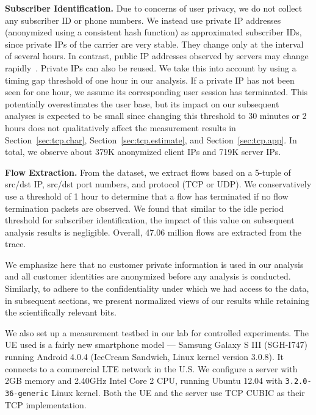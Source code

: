 \textbf{Subscriber Identification.} Due to concerns of user privacy, we do not collect any subscriber ID or phone numbers. We instead use private IP addresses (anonymized using a consistent hash function) as approximated subscriber IDs, since private IPs of the carrier are very stable. They change only at the interval of several hours. In contrast, public IP addresses observed by servers may change rapidly~\cite{Mahesh:Ephemera:IMC09}. Private IPs can also be reused. We take this into account by using a timing gap threshold of one hour in our analysis. If a private IP has not been seen for one hour, we assume its corresponding user session has terminated. This potentially overestimates the user base, but its impact on our subsequent analyses is expected to be small since changing this threshold to 30 minutes or 2 hours does not qualitatively affect the measurement results in Section~\ref{sec:tcp.char}, Section~\ref{sec:tcp.estimate}, and Section~\ref{sec:tcp.app}. In total, we observe about 379K anonymized client IPs and 719K server IPs.

\textbf{Flow Extraction.}  From the dataset, we extract flows based on a 5-tuple of src/dst IP, src/dst port numbers,
and protocol (TCP or UDP). We conservatively use a threshold of 1 hour to determine that a flow has
terminated if no flow termination packets are observed. We found that similar to the idle period threshold for subscriber identification, the impact of this value on subsequent analysis results is negligible. Overall, 47.06 million flows are extracted from the trace.

We emphasize here that no customer private information is used in our
analysis and all customer identities are anonymized before any
analysis is conducted. Similarly, to adhere to the confidentiality
under which we had access to the data, in subsequent sections, we present normalized views of our results while retaining the scientifically
relevant bits.

\label{sec:tcp.testbed}

We also set up a measurement testbed in our lab for controlled experiments. The UE used is a fairly new smartphone model --- Samsung Galaxy S III (SGH-I747) running Android 4.0.4 (IceCream Sandwich, Linux kernel version 3.0.8). It connects to a commercial LTE network in the U.S.  We configure a server with 2GB memory and 2.40GHz Intel Core 2 CPU, running Ubuntu 12.04 with \texttt{3.2.0-36-generic} Linux kernel. Both the UE and the server use TCP CUBIC as their TCP implementation.

